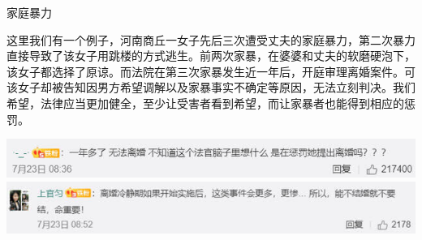 \begin{frame}{家庭暴力}
    \begin{block}{}
        这里我们有一个例子，河南商丘一女子先后三次遭受丈夫的家庭暴力，第二次暴力直接导致了该女子用跳楼的方式逃生。前两次家暴，在婆婆和丈夫的软磨硬泡下，该女子都选择了原谅。而法院在第三次家暴发生近一年后，开庭审理离婚案件。可该女子却被告知因男方希望调解以及家暴事实不确定等原因，无法立刻判决。我们希望，法律应当更加健全，至少让受害者看到希望，而让家暴者也能得到相应的惩罚。
    \end{block}
    \begin{center}
        \includegraphics[width=.9\textwidth]{../docs/img/3-7.jpg}
        \includegraphics[width=.9\textwidth]{../docs/img/3-8.jpg}
    \end{center}
\end{frame}



